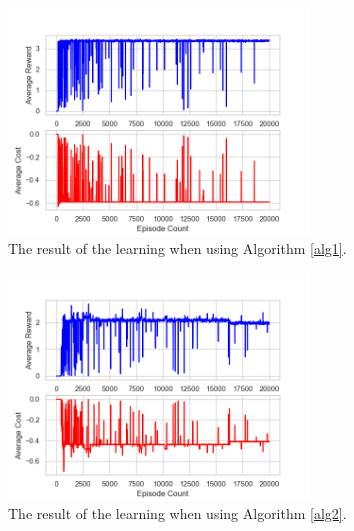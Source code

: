 \documentclass[letterpaper, 10 pt, conference]{ieeeconf}
\begin{document}
\begin{figure}[htbp]
   \centering
   \vspace{2mm}
   \includegraphics[width = 8cm]{epi20000_step20000_gamma099_ses1_re10_cost01_01_su2.png}
   \caption{The result of the learning when using Algorithm \ref{alg1}.}
   \label{result1}
\end{figure}

\begin{figure}[htbp]
   \centering
   \vspace{2mm}
   \includegraphics[width = 8cm]{epi20000_step20000_gamma099_ses1_re10_cost01_01_Q-T_su2.png}
   \caption{The result of the learning when using Algorithm \ref{alg2}.}
   \label{result2}
\end{figure}
\end{document}
